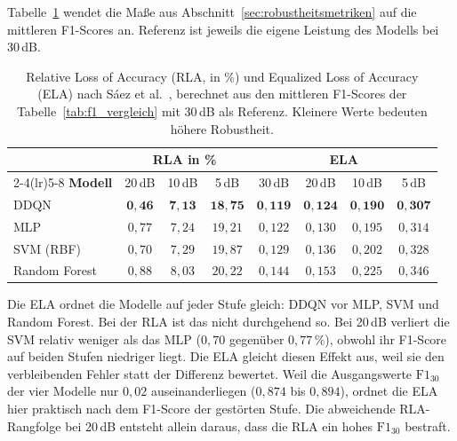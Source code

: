 Tabelle~\ref{tab:rla_ela} wendet die Maße aus Abschnitt~\ref{sec:robustheitsmetriken} auf die mittleren F1-Scores an. Referenz ist jeweils die eigene Leistung des Modells bei 30\,dB.

\begin{table}[htbp]
	\centering
	\small
	\setlength{\tabcolsep}{4pt}
	\renewcommand{\arraystretch}{1.2}
	\caption[Relative Loss of Accuracy und Equalized Loss of Accuracy]{Relative Loss of Accuracy (RLA, in \%) und Equalized Loss of Accuracy (ELA) nach Sáez et al.~\autocite{saezEvaluatingClassifierBehavior2016}, berechnet aus den mittleren F1-Scores der Tabelle~\ref{tab:f1_vergleich} mit 30\,dB als Referenz. Kleinere Werte bedeuten höhere Robustheit.}
	\label{tab:rla_ela}
	\begin{tabular}{lccccccc}
		\toprule
		& \multicolumn{3}{c}{\textbf{RLA in \%}} & \multicolumn{4}{c}{\textbf{ELA}} \\
		\cmidrule(lr){2-4}\cmidrule(lr){5-8}
		\textbf{Modell} & 20\,dB & 10\,dB & 5\,dB & 30\,dB & 20\,dB & 10\,dB & 5\,dB \\
		\midrule
		DDQN          & $\mathbf{0{,}46}$ & $\mathbf{7{,}13}$ & $\mathbf{18{,}75}$ & $\mathbf{0{,}119}$ & $\mathbf{0{,}124}$ & $\mathbf{0{,}190}$ & $\mathbf{0{,}307}$ \\
		MLP           & $0{,}77$ & $7{,}24$ & $19{,}21$ & $0{,}122$ & $0{,}130$ & $0{,}195$ & $0{,}314$ \\
		SVM (RBF)     & $0{,}70$ & $7{,}29$ & $19{,}87$ & $0{,}129$ & $0{,}136$ & $0{,}202$ & $0{,}328$ \\
		Random Forest & $0{,}88$ & $8{,}03$ & $20{,}22$ & $0{,}144$ & $0{,}153$ & $0{,}225$ & $0{,}346$ \\
		\bottomrule
	\end{tabular}
\end{table}

Die ELA ordnet die Modelle auf jeder Stufe gleich: DDQN vor MLP, SVM und Random Forest. Bei der RLA ist das nicht durchgehend so. Bei 20\,dB verliert die SVM relativ weniger als das MLP ($0{,}70$ gegenüber $0{,}77\,\%$), obwohl ihr F1-Score auf beiden Stufen niedriger liegt. Die ELA gleicht diesen Effekt aus, weil sie den verbleibenden Fehler statt der Differenz bewertet. Weil die Ausgangswerte $\mathrm{F1}_{30}$ der vier Modelle nur $0{,}02$ auseinanderliegen ($0{,}874$ bis $0{,}894$), ordnet die ELA hier praktisch nach dem F1-Score der gestörten Stufe. Die abweichende RLA-Rangfolge bei 20\,dB entsteht allein daraus, dass die RLA ein hohes $\mathrm{F1}_{30}$ bestraft.

